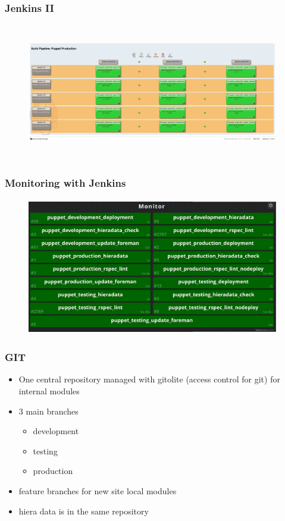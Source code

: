 \documentclass{beamer}
\begin{document}
\begin{frame}
  \frametitle{Jenkins II}
  \begin{figure}[ht]
    \centering
      \includegraphics[height=6cm,width=11cm]{../pics/jenkins_pipeline}
    \label{fig:stack}
  \end{figure}
\end{frame}


\begin{frame}
  \frametitle{Monitoring with Jenkins}
  \begin{figure}[ht]
    \centering
      \includegraphics[height=6cm,width=11cm]{../pics/jenkins_monitor}
    \label{fig:stack}
  \end{figure}
\end{frame}

\begin{frame}
  \frametitle{GIT}

  \begin{itemize}
  \item One central repository managed with gitolite (access control
    for git) for internal modules
  \item 3 main branches
    \begin{itemize}
    \item development
    \item testing
    \item production
    \end{itemize}
  \item feature branches for new site local modules
  \item hiera data is in the same repository
  \end{itemize}
\end{frame}
\end{document}
